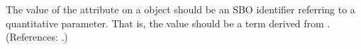 The value of the attribute  on a \LocalParameter object should be
an SBO identifier referring to a quantitative parameter.  That is, the
value should be a term derived from \sboparameter.  (References: .)
